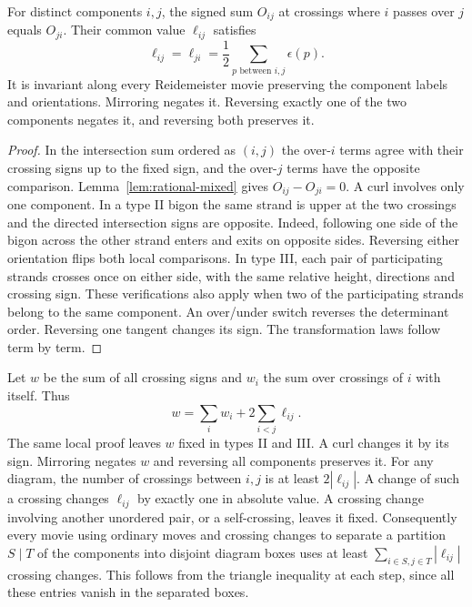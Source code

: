 \begin{theorem}
For distinct components $i,j$, the signed sum $O_{ij}$ at crossings
where $i$ passes over $j$ equals $O_{ji}$. Their common value
$\ell_{ij}$ satisfies
\[
  \ell_{ij}=\ell_{ji}
  =\frac12\sum_{p\text{ between }i,j}\epsilon(p).
\]
It is invariant along every Reidemeister movie preserving the component
labels and orientations. Mirroring negates it. Reversing exactly one
of the two components negates it, and reversing both preserves it.
\end{theorem}
\begin{proof}
In the intersection sum ordered as $(i,j)$ the over-$i$ terms agree with
their crossing signs up to the fixed sign, and the over-$j$ terms have the
opposite comparison. Lemma~\ref{lem:rational-mixed} gives
$O_{ij}-O_{ji}=0$. A curl involves only one component. In a type II
bigon the same strand is upper at the two crossings and the directed
intersection signs are opposite. Indeed, following one side of the bigon
across the other strand enters and exits on opposite sides. Reversing
either orientation flips both local comparisons. In type III, each
pair of participating strands crosses once on either side, with the same
relative height, directions and crossing sign. These verifications also
apply when two of the participating strands belong to the same component.
An over/under switch reverses the determinant order. Reversing one tangent
changes its sign. The transformation laws follow term by term.
\end{proof}

Let $w$ be the sum of all crossing signs and $w_i$ the sum over crossings
of $i$ with itself. Thus
\[
  w=\sum_i w_i+2\sum_{i<j}\ell_{ij}.
\]
The same local proof leaves $w$ fixed in types II and III. A curl changes
it by its sign. Mirroring negates $w$ and reversing all components
preserves it. For any diagram, the number of crossings between $i,j$
is at least $2|\ell_{ij}|$. A change of such a crossing changes
$\ell_{ij}$ by exactly one in absolute value. A crossing change involving
another unordered pair, or a self-crossing, leaves it fixed. Consequently
every movie using ordinary moves and crossing changes to separate a
partition $S\mid T$ of the components into disjoint diagram boxes
uses at least $\sum_{i\in S,j\in T}|\ell_{ij}|$ crossing changes.
This follows from the triangle inequality at each step, since all these
entries vanish in the separated boxes.

